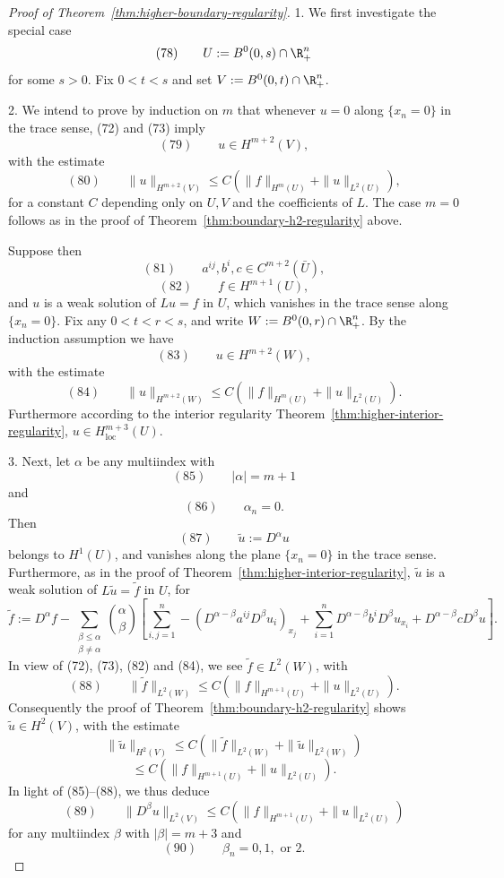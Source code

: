 \begin{proof}[Proof of Theorem~\ref{thm:higher-boundary-regularity}]
1. We first investigate the special case
$$(78) \qquad U := B^0(0,s) \cap \R^n_+$$
for some $s > 0$. Fix $0 < t < s$ and set $V := B^0(0,t) \cap \R^n_+$.

2. We intend to prove by induction on $m$ that whenever $u = 0$ along $\{x_n = 0\}$ in the trace sense, (72) and (73) imply
$$(79) \qquad u \in H^{m+2}(V),$$
with the estimate
$$(80) \qquad \|u\|_{H^{m+2}(V)} \leq C(\|f\|_{H^m(U)} + \|u\|_{L^2(U)}),$$
for a constant $C$ depending only on $U, V$ and the coefficients of $L$. The case $m = 0$ follows as in the proof of Theorem~\ref{thm:boundary-h2-regularity} above.

Suppose then
$$(81) \qquad a^{ij}, b^i, c \in C^{m+2}(\bar U),$$
$$(82) \qquad f \in H^{m+1}(U),$$
and $u$ is a weak solution of $Lu = f$ in $U$, which vanishes in the trace sense along $\{x_n = 0\}$. Fix any $0 < t < r < s$, and write $W := B^0(0,r) \cap \R^n_+$. By the induction assumption we have
$$(83) \qquad u \in H^{m+2}(W),$$
with the estimate
$$(84) \qquad \|u\|_{H^{m+2}(W)} \leq C(\|f\|_{H^m(U)} + \|u\|_{L^2(U)}).$$
Furthermore according to the interior regularity Theorem~\ref{thm:higher-interior-regularity}, $u \in H^{m+3}_{\text{loc}}(U)$.

3. Next, let $\alpha$ be any multiindex with
$$(85) \qquad |\alpha| = m+1$$
and
$$(86) \qquad \alpha_n = 0.$$
Then
$$(87) \qquad \tilde u := D^\alpha u$$
belongs to $H^1(U)$, and vanishes along the plane $\{x_n=0\}$ in the trace sense. Furthermore, as in the proof of Theorem~\ref{thm:higher-interior-regularity}, $\tilde u$ is a weak solution of $L\tilde u = \tilde f$ in $U$, for
$$\tilde f := D^\alpha f - \sum_{\substack{\beta \leq \alpha \\ \beta \neq \alpha}}\binom\alpha\beta\left[\sum_{i,j=1}^n -(D^{\alpha-\beta}a^{ij}D^\beta u_i)_{x_j} + \sum_{i=1}^n D^{\alpha-\beta}b^iD^\beta u_{x_i} + D^{\alpha-\beta}cD^\beta u\right].$$
In view of (72), (73), (82) and (84), we see $\tilde f \in L^2(W)$, with
$$(88) \qquad \|\tilde f\|_{L^2(W)} \leq C(\|f\|_{H^{m+1}(U)} + \|u\|_{L^2(U)}).$$
Consequently the proof of Theorem~\ref{thm:boundary-h2-regularity} shows $\tilde u \in H^2(V)$, with the estimate
$$\|\tilde u\|_{H^2(V)} \leq C(\|\tilde f\|_{L^2(W)} + \|\tilde u\|_{L^2(W)})$$
$$\leq C(\|f\|_{H^{m+1}(U)} + \|u\|_{L^2(U)}).$$
In light of (85)--(88), we thus deduce
$$(89) \qquad \|D^\beta u\|_{L^2(V)} \leq C(\|f\|_{H^{m+1}(U)} + \|u\|_{L^2(U)})$$
for any multiindex $\beta$ with $|\beta| = m+3$ and
$$(90) \qquad \beta_n = 0, 1, \text{ or } 2.$$


\end{proof}
